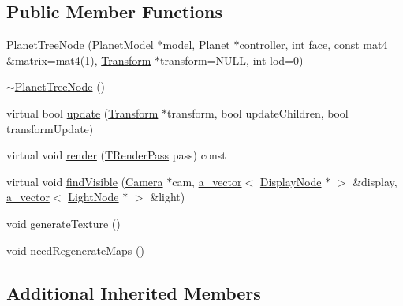 \subsection*{Public Member Functions}
\begin{DoxyCompactItemize}
\item 
\hyperlink{class_planet_tree_node_aa92af6169edbe87d6634a51b42885955}{Planet\+Tree\+Node} (\hyperlink{class_planet_model}{Planet\+Model} $\ast$model, \hyperlink{class_planet}{Planet} $\ast$controller, int \hyperlink{_planet_8cpp_ae1161f79bdbe47164b23549af2139d25}{face}, const mat4 \&matrix=mat4(1), \hyperlink{class_agmd_maths_1_1_transform}{Transform} $\ast$transform=N\+U\+L\+L, int lod=0)
\item 
\hyperlink{class_planet_tree_node_a99ce00aa4736ca0231ffffda431feb24}{$\sim$\+Planet\+Tree\+Node} ()
\item 
virtual bool \hyperlink{class_planet_tree_node_ad14bdf9e466f0267ba56782fbae6a9ec}{update} (\hyperlink{class_agmd_maths_1_1_transform}{Transform} $\ast$transform, bool update\+Children, bool transform\+Update)
\item 
virtual void \hyperlink{class_planet_tree_node_a54479e30d42d32cbb904b2d396646eaa}{render} (\hyperlink{namespace_agmd_a893087981df53d0bf39466e9039aeb73}{T\+Render\+Pass} pass) const 
\item 
virtual void \hyperlink{class_planet_tree_node_a7e08300b24c7656d04debb88f07c9cfe}{find\+Visible} (\hyperlink{class_agmd_1_1_camera}{Camera} $\ast$cam, \hyperlink{_vector_8h_a3df82cea60ff4ad0acb44e58454406a5}{a\+\_\+vector}$<$ \hyperlink{class_agmd_1_1_display_node}{Display\+Node} $\ast$ $>$ \&display, \hyperlink{_vector_8h_a3df82cea60ff4ad0acb44e58454406a5}{a\+\_\+vector}$<$ \hyperlink{class_agmd_1_1_light_node}{Light\+Node} $\ast$ $>$ \&light)
\item 
void \hyperlink{class_planet_tree_node_a6551b608c3765cc429d6cb2b1107a705}{generate\+Texture} ()
\item 
void \hyperlink{class_planet_tree_node_a6f4d8eafc50cbfd3e7e14c3d7f1cdb65}{need\+Regenerate\+Maps} ()
\end{DoxyCompactItemize}
\subsection*{Additional Inherited Members}


